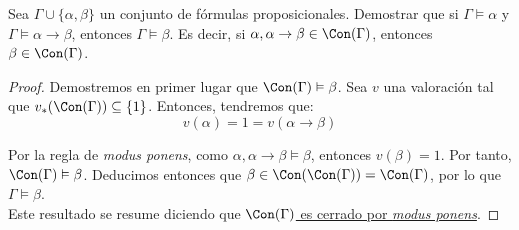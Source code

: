 \begin{comment}
    \end{proof}
\end{prop}
\end{comment}


\begin{ejercicio}
    Sea $\Gamma \cup \{\alpha,\beta\}$ un conjunto de fórmulas proposicionales.
    Demostrar que si $\Gamma \vDash \alpha$ y $\Gamma \vDash \alpha\rightarrow \beta$, entonces $\Gamma \vDash \beta$.
    Es decir, si $\alpha,\alpha\to \beta \in \Con(\Gamma)$, entonces $\beta\in \Con(\Gamma)$.
    \begin{proof}
        Demostremos en primer lugar que $\Con(\Gamma)\vDash \beta$.
        Sea $v$ una valoración tal que $v_\ast(\Con(\Gamma))\subseteq \{1\}$. Entonces, tendremos que:
        \begin{equation*}
            v(\alpha)=1=v(\alpha\rightarrow\beta)
        \end{equation*}
        
        Por la regla de \emph{modus ponens}, como $\alpha,\alpha\rightarrow\beta\vDash \beta$, entonces $v(\beta)=1$.
        Por tanto, $\Con(\Gamma)\vDash \beta$.
        Deducimos entonces que $\beta \in \Con(\Con(\Gamma)) = \Con(\Gamma)$, por lo que $\Gamma \vDash \beta$.\\

        Este resultado se resume diciendo que \ul{$\Con(\Gamma)$ es cerrado por \emph{modus ponens}}.
    \end{proof}
\end{ejercicio}


